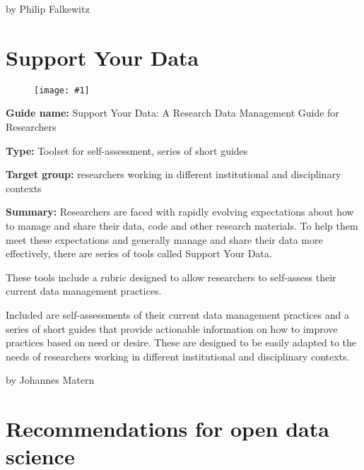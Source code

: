 \documentclass{article}
\newlength{\imgwidth}
\newcommand\scaledgraphics[2]{%
                
\settowidth{\imgwidth}{\texttt{[image: \#1]}}%
                
\setlength{\imgwidth}{\minof{\imgwidth}{#2\textwidth}}%
                
\texttt{[image: \#1]}%
                
}
\begin{document}
by Philip Falkewitz





\section{Support Your Data}\label{H2541051}



\begin{center}
\begin{figure}
\scaledgraphics{45bdf5de-7e5b-448d-820a-d3b3288a4dbe.png}{0.5}
\label{F88206441}
\end{figure}


\end{center}


\textbf{Guide name:} Support Your Data: A Research Data Management Guide for Researchers \autocite{borghi_support_2018}


\textbf{Type:} Toolset for self-assessment, series of short guides


\textbf{Target group:} researchers working in different institutional and disciplinary contexts


\textbf{Summary:} Researchers are faced with rapidly evolving expectations about how to manage and share their data, code and other research materials. To help them meet these expectations and generally manage and share their data more effectively, there are series of tools called Support Your Data.


These tools include a rubric designed to allow researchers to self-assess their current data management practices.


Included are self-assessments of their current data management practices and a series of short guides that provide actionable information on how to improve practices based on need or desire. These are designed to be easily adapted to the needs of researchers working in different institutional and disciplinary contexts.





by Johannes Matern





\section{ Recommendations for open data science}\label{H2986141}
\end{document}
